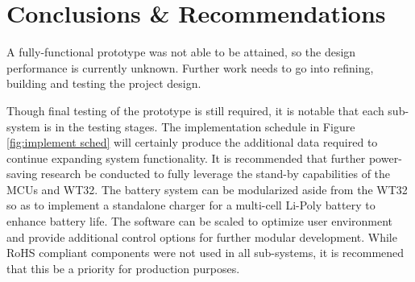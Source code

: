 \section[Conclusions \& Recommendations]{Conclusions \& Recommendations}
A fully-functional prototype was not able to be attained, so the design
performance is currently unknown. Further work needs to go into refining,
building and testing the project design.

Though final testing of the prototype is still required, it is notable that each sub-system is
in the testing stages. The implementation schedule in Figure \ref{fig:implement sched} will
certainly produce the additional data required to continue expanding system functionality.
It is recommended that further power-saving research be conducted to fully leverage the 
stand-by capabilities of the MCUs and WT32. The battery system can be modularized aside from 
the WT32 so as to implement a standalone charger for a multi-cell Li-Poly battery to enhance
battery life. The software can be scaled to optimize user environment and provide additional control
options for further modular development. While RoHS compliant components were not used in all
sub-systems, it is recommened that this be a priority for production purposes.  
